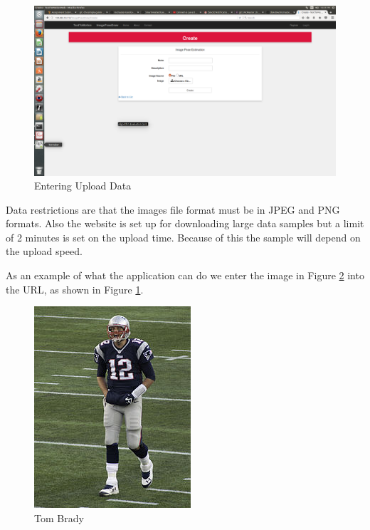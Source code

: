 \documentclass{scrreprt}
\begin{document}
\begin{figure}
  \includegraphics[width=\linewidth]{greenButtonPage.png}
  \caption{Entering Upload Data}
  \label{fig:uploadPage}
\end{figure}

Data restrictions are that the images file format must be in JPEG and PNG
formats.  Also the website is set up for downloading large data samples but a
limit of 2 minutes is set on the upload time.  Because of this the sample will
depend on the upload speed.

As an example of what the application can do we enter the image in Figure
\ref{fig:tomBrady} into the URL, as shown in Figure \ref{fig:uploadPage}.

\begin{figure}
  \includegraphics[width=\linewidth]{tbrady.jpg}
  \caption{Tom Brady}
  \label{fig:tomBrady}
\end{figure}
\end{document}
